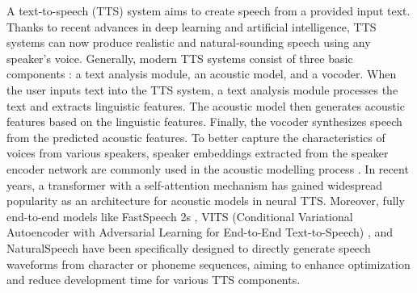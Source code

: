 A text-to-speech (TTS) system aims to create speech from a provided input text. Thanks to recent advances in deep learning and artificial intelligence, TTS systems can now produce realistic and natural-sounding speech using any speaker’s voice. Generally, modern TTS systems consist of three basic components \cite{surveytts}: a text analysis module, an acoustic model, and a vocoder. When the user inputs text into the TTS system, a text analysis module processes the text and extracts linguistic features. The acoustic model then generates acoustic features based on the linguistic features. Finally, the vocoder synthesizes speech from the predicted acoustic features. To better capture the characteristics of voices from various speakers, speaker embeddings extracted from the speaker encoder network are commonly used in the acoustic modelling process \cite{jia2018transfer}. In recent years, a transformer with a self-attention mechanism \cite{transformer} has gained widespread popularity as an architecture for acoustic models in neural TTS. Moreover, fully end-to-end models like FastSpeech 2s \cite{ren2021fastspeech}, VITS (Conditional Variational Autoencoder with Adversarial Learning for End-to-End Text-to-Speech) \cite {vits}, and NaturalSpeech \cite{naturalspeech} have been specifically designed to directly generate speech waveforms from character or phoneme sequences, aiming to enhance optimization and reduce development time for various TTS components.

